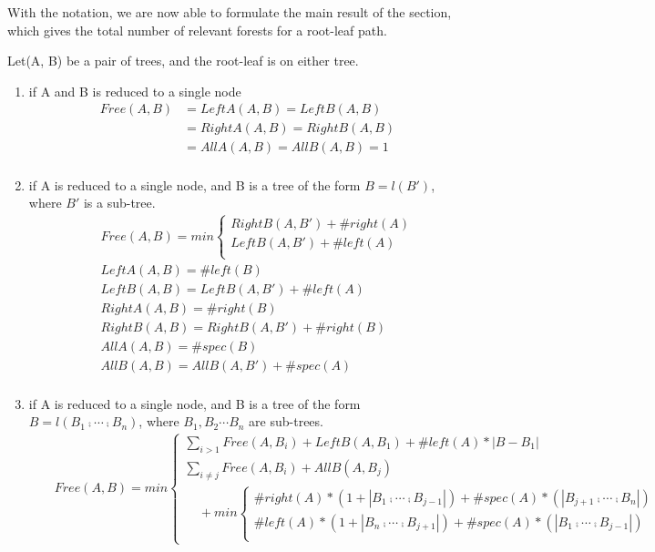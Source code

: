 With the notation, we are now able to formulate the main result of the section, which gives the total number of relevant forests for a root-leaf path.
\begin{theorem}
Let(A, B) be a pair of trees, and the root-leaf is on either tree.
\begin{enumerate}
\item if A and B is reduced to a single node 
\begin{align*}
Free(A, B) &= LeftA(A, B) = LeftB(A, B)\\
&= RightA(A, B) = RightB(A, B)\\
&= AllA(A, B) = AllB(A, B) = 1\\
\end{align*}
\item if A is reduced to a single node, and B is a tree of the form $B = l(B')$, where $B'$ is a sub-tree.
\begin{eqnarray*}
&&Free(A, B) = min \begin{cases}
			RightB(A, B') + \#right(A)\\
			LeftB(A, B') + \#left(A)\\
			\end{cases}\\
&&LeftA(A, B) = \#left(B)\\
&&LeftB(A, B) = LeftB(A, B') + \#left(A)\\
&&RightA(A, B) = \#right(B)\\
&&RightB(A, B) = RightB(A, B') + \#right(B)\\
&&AllA(A, B) = \#spec(B)\\
&&AllB(A, B) = AllB(A, B') + \#spec(A)\\
\end{eqnarray*}
\item if A is reduced to a single node, and B is a tree of the form $B = l(B_1 \comp \cdots \comp B_n)$, where $B_1, B_2 \cdots B_n$ are sub-trees.
\begin{eqnarray*}
&&Free(A, B) = min \begin{cases}
			\sum_{i>1}Free(A, B_i) + LeftB(A, B_1) + \#left(A) * \left\vert  B - B_1 \right\vert \\
			\sum_{i \neq j}Free(A, B_i) + AllB(A, B_j) \\
			\ \ \ \ \ + min \begin{cases}
			\#right(A) * (1 + \left\vert B_1 \comp \cdots \comp B_{j-1} \right\vert) + \#spec(A) * (\left\vert B_{j+1} \comp \cdots \comp B_n \right\vert) \\
			\#left(A) * (1 + \left\vert B_n \comp \cdots \comp B_{j+1} \right\vert) + \#spec(A) * (\left\vert B_1 \comp \cdots \comp B_{j-1} \right\vert) \\

\end{cases}
\end{cases}
\end{eqnarray*}
\end{enumerate}
\end{theorem}
